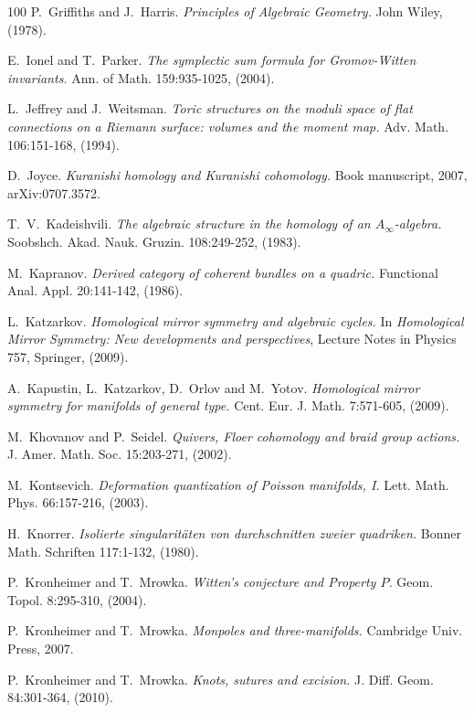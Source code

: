 \documentclass[reqno,10pt]{amsart}
\numberwithin{equation}{section}
\theoremstyle{remark}
\begin{document}
\begin{thebibliography}{100}
P.~Griffiths and J.~Harris.
\emph{Principles of Algebraic Geometry.}
John Wiley, (1978).

E.~Ionel and T.~Parker.
\emph{The symplectic sum formula for Gromov-Witten invariants.}
Ann. of Math. 159:935-1025, (2004).

L.~Jeffrey and J.~Weitsman.
\emph{Toric structures on the moduli space of flat connections on a Riemann surface: volumes and the moment map.}
Adv. Math. 106:151-168, (1994).

D.~Joyce.
\emph{Kuranishi homology and Kuranishi cohomology.}
Book manuscript, 2007, arXiv:0707.3572.

T.~V.~Kadeishvili.
\emph{The algebraic structure in the homology of an $A_{\infty}$-algebra.}
Soobshch. Akad. Nauk. Gruzin. 108:249-252, (1983).

M.~Kapranov.
\emph{Derived category of coherent bundles on a quadric.}
Functional Anal. Appl. 20:141-142, (1986).

L.~Katzarkov.
\emph{Homological mirror symmetry and algebraic cycles.}
In \emph{Homological Mirror Symmetry: New developments and perspectives}, Lecture Notes in Physics 757, Springer, (2009).

A.~Kapustin, L.~Katzarkov, D.~Orlov and M.~Yotov.
\emph{Homological mirror symmetry for manifolds of general type.}
Cent. Eur. J. Math. 7:571-605, (2009).

M.~Khovanov and P.~Seidel.
\emph{Quivers, Floer cohomology and braid group actions.}
J. Amer. Math. Soc. 15:203-271, (2002).

M.~Kontsevich.
\emph{Deformation quantization of Poisson manifolds, I.}
Lett. Math. Phys. 66:157-216, (2003).


H.~Knorrer.
\emph{Isolierte singularit\"aten von durchschnitten zweier quadriken.}
Bonner Math. Schriften 117:1-132, (1980).

P.~Kronheimer and T.~Mrowka.
\emph{Witten's conjecture and Property $P$.}
Geom. Topol. 8:295-310, (2004).


P.~Kronheimer and T.~Mrowka.
\emph{Monpoles and three-manifolds.}
Cambridge Univ. Press, 2007.





P.~Kronheimer and T.~Mrowka.
\emph{Knots, sutures and excision.}
J. Diff. Geom. 84:301-364, (2010).


\end{thebibliography}
\end{document}
